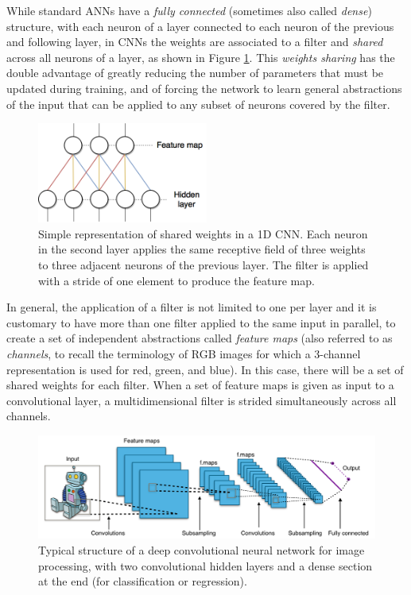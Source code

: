 While standard ANNs have a \textit{fully connected} (sometimes also called 
\textit{dense}) structure, with each neuron of a layer connected to each neuron 
of the previous and following layer, in CNNs the weights are associated to a 
filter and \textit{shared} across all neurons of a layer, as shown in Figure
\ref{f:shared_weights}. 
This \textit{weights sharing} has the double advantage of greatly reducing the 
number of parameters that must be updated during training, and of forcing the 
network to learn general abstractions of the input that can be applied to any 
subset of neurons covered by the filter.
%
\begin{figure}
    \includegraphics[width=0.5\textwidth]{pictures/shared_weights}
    \centering
    \caption[Shared weights in CNN]{Simple representation of shared weights in 
	    a 1D CNN. Each neuron in  the second layer applies the same 
	    receptive field of three weights to three adjacent neurons of the 
	    previous layer. The filter is applied with a stride of one element 
	    to produce the feature map.}
    \label{f:shared_weights}
\end{figure}
%

In general, the application of a filter is not limited to one per layer and it 
is customary to have more than one filter applied to the same input in parallel,
to create a set of independent abstractions called \textit{feature maps} (also
referred to as \textit{channels}, to recall the terminology of RGB images for 
which a 3-channel representation is used for red, green, and blue). In 
this case, there will be a set of shared weights for each filter.
When a set of feature maps is given as input to a convolutional layer, a 
multidimensional filter is strided simultaneously across all channels.
%
\begin{figure}
    \includegraphics[width=	\textwidth]{pictures/CNN}
    \centering
    \caption[CNN for image processing]{Typical structure of a deep convolutional 
	     neural network for image processing, with two convolutional hidden 
	     layers and a dense section at the end (for classification or 
	     regression).}
    \label{f:imagenet}
\end{figure}
%

